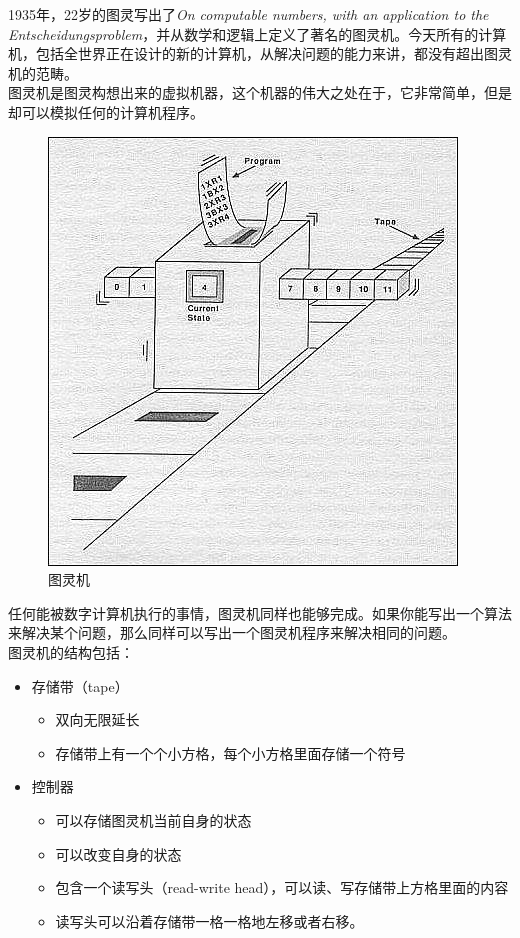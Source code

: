 1935年，22岁的图灵写出了\textit{On computable numbers, with an application to the Entscheidungsproblem}，并从数学和逻辑上定义了著名的图灵机。今天所有的计算机，包括全世界正在设计的新的计算机，从解决问题的能力来讲，都没有超出图灵机的范畴。\\

图灵机是图灵构想出来的虚拟机器，这个机器的伟大之处在于，它非常简单，但是却可以模拟任何的计算机程序。\\

\begin{figure}[H]
    \centering
    \includegraphics[scale=3]{img/Chapter3/3-1/1.png}
    \caption{图灵机}
\end{figure}

任何能被数字计算机执行的事情，图灵机同样也能够完成。如果你能写出一个算法来解决某个问题，那么同样可以写出一个图灵机程序来解决相同的问题。\\

图灵机的结构包括：

\begin{itemize}
    \item 存储带（tape）
          \begin{itemize}
              \item 双向无限延长
              \item 存储带上有一个个小方格，每个小方格里面存储一个符号
          \end{itemize}

    \item 控制器
          \begin{itemize}
              \item 可以存储图灵机当前自身的状态
              \item 可以改变自身的状态
              \item 包含一个读写头（read-write head），可以读、写存储带上方格里面的内容
              \item 读写头可以沿着存储带一格一格地左移或者右移。
          \end{itemize}
\end{itemize}

